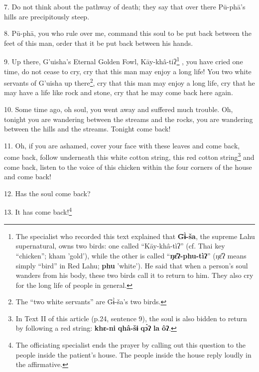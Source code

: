 7. Do not think about the pathway of death; they say that over there Pū-phā's
hills are precipitously steep.

8. Pū-phā, you who rule over me, command this soul to be put back between the
feet of this man, order that it be put back between his hands.

9. Up there, G'uisha's Eternal Golden Fowl, Kāy-khâ-tiʔ\footnote{The specialist who recorded this text explained that \textbf{G̈ɨ̀-ša}, the supreme Lahu supernatural, owns two birds: one called ``Kāy-khâ-tìʔ'' (cf. Thai key ``chicken''; kham 'gold'), while the other is called ``\textbf{ŋɛ̂ʔ-phu-tìʔ}'' (ŋɛ̂ʔ means simply ``bird'' in Red Lahu; \textbf{phu} 'white'). He said that when a person's soul wanders from his body, these two birds call it to return to him. They also cry for the long life of people in general.} , you have cried
one time, do not cease to cry, cry that this man may enjoy a long life! You two
white servants of G'uisha up there\footnote{The ``two white servants'' are G̈ɨ̀-ša's two birds.}, cry that this man may enjoy a long life,
cry that he may have a life like rock and stone, cry that he may come back here
again.

10. Some time ago, oh soul, you went away and suffered much trouble. Oh, tonight
you are wandering between the streams and the rocks, you are wandering between
the hills and the streams. Tonight come back!

11. Oh, if you are ashamed, cover your face with these leaves and come back, come
back, follow underneath this white cotton string, this red cotton string\footnote{In Text II of this article (p.24, sentence 9), the soul is also bidden to return by following a red string: \textbf{khɛ-ni} \textbf{qhâ-šɨ} \textbf{qɔ̀ʔ} \textbf{la} \textbf{ôʔ}.}
and come back, listen to the voice of this chicken within the four corners of the
house and come back!

12. Has the soul come back?

13. It has come back!\footnote{The officiating specialist ends the prayer by calling out this question to the people inside the patient's house. The people inside the house reply loudly in the affirmative.}

